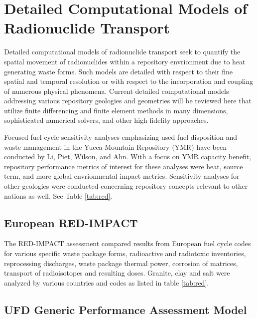 \section{Detailed Computational Models of Radionuclide Transport}
\label{sec:detailed_radionuclide}

Detailed computational models of radionuclide transport seek to quantify the spatial 
movement of radionuclides within a repository envrionment due to heat 
generating waste forms. Such models are detailed with respect to their fine 
spatial and temporal resolution or with respect to the incorporation and 
coupling of numerous physical phenomena. Current detailed computational models 
addressing various repository geologies and geometries will be reviewed here 
that utilize finite differencing and finite element methods in many dimensions, 
sophisticated numerical solvers, and other high fidelity approaches.

Focused fuel cycle sensitivity analyses emphasizing used fuel disposition and
waste management in the Yucca Mountain Repository (YMR) have been conducted by
Li, Piet, Wilson, and Ahn. With a focus on YMR capacity benefit, repository
performance metrics of interest for these analyses were heat, source term, and
more global envrionmental impact metrics.  Sensitivity analyses for other
geologies were conducted concerning repository concepts relevant to other
nations as well. See Table \ref{tab:red}.

\subsection{European RED-IMPACT} 

The RED-IMPACT assessment compared
results from European fuel cycle codes for various specific waste package
forms, radioactive and radiotoxic inventories, reprocessing discharges,  waste
package thermal power, corrosion of matrices, transport of radioisotopes and
resulting doses.  Granite, clay and salt were analyzed by various countries and 
codes as listed in table \ref{tab:red}.







\subsection{UFD Generic Performance Assessment Model}

